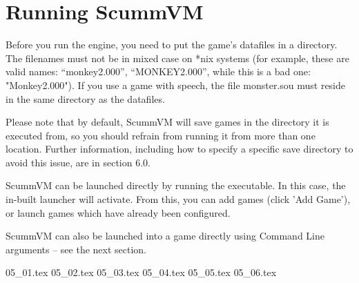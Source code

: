 


\section{Running ScummVM}

Before you run the engine, you need to put the game's datafiles in a
directory. The filenames must not be in mixed case on *nix systems
(for example, these are valid names: ``monkey2.000'', ``MONKEY2.000'', while
this is a bad one: "Monkey2.000"). If you use a game with speech, the file
monster.sou must reside in the same directory as the datafiles.

Please note that by default, ScummVM will save games in the directory
it is executed from, so you should refrain from running it from more than
one location. Further information, including how to specify a specific save
directory to avoid this issue, are in section 6.0.

ScummVM can be launched directly by running the executable. In this case,
the in-built launcher will activate. From this, you can add games (click
'Add Game'), or launch games which have already been configured.

ScummVM can also be launched into a game directly using Command Line
arguments -- see the next section.

 {05_01.tex}
 {05_02.tex}
 {05_03.tex}
 {05_04.tex}
 {05_05.tex}
 {05_06.tex}
